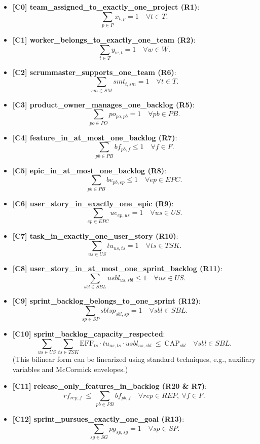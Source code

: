 \documentclass[11pt]{article}
\begin{document}
\begin{itemize}[leftmargin=*,itemsep=8pt]
  \item \textbf{[C0] team\_assigned\_to\_exactly\_one\_project (R1)}:
  \[
  \sum_{p\in P} x_{t,p}=1 \quad \forall t\in T.
  \]

  \item \textbf{[C1] worker\_belongs\_to\_exactly\_one\_team (R2)}:
  \[
  \sum_{t\in T} y_{w,t}=1 \quad \forall w\in W.
  \]

  \item \textbf{[C2] scrummaster\_supports\_one\_team (R6)}:
  \[
  \sum_{sm\in SM} smt_{t,sm}=1 \quad \forall t\in T.
  \]

  \item \textbf{[C3] product\_owner\_manages\_one\_backlog (R5)}:
  \[
  \sum_{po\in PO} po_{po,pb}=1 \quad \forall pb\in PB.
  \]

  \item \textbf{[C4] feature\_in\_at\_most\_one\_backlog (R7)}:
  \[
  \sum_{pb\in PB} bf_{pb,f}\le 1 \quad \forall f\in F.
  \]

  \item \textbf{[C5] epic\_in\_at\_most\_one\_backlog (R8)}:
  \[
  \sum_{pb\in PB} be_{pb,ep}\le 1 \quad \forall ep\in EPC.
  \]

  \item \textbf{[C6] user\_story\_in\_exactly\_one\_epic (R9)}:
  \[
  \sum_{ep\in EPC} ue_{ep,us}=1 \quad \forall us\in US.
  \]

  \item \textbf{[C7] task\_in\_exactly\_one\_user\_story (R10)}:
  \[
  \sum_{us\in US} tu_{us,ts}=1 \quad \forall ts\in TSK.
  \]

  \item \textbf{[C8] user\_story\_in\_at\_most\_one\_sprint\_backlog (R11)}:
  \[
  \sum_{sbl\in SBL} usbl_{us,sbl}\le 1 \quad \forall us\in US.
  \]

  \item \textbf{[C9] sprint\_backlog\_belongs\_to\_one\_sprint (R12)}:
  \[
  \sum_{sp\in SP} sblsp_{sbl,sp}=1 \quad \forall sbl\in SBL.
  \]

  \item \textbf{[C10] sprint\_backlog\_capacity\_respected}:
  \[
  \sum_{us\in US}\sum_{ts\in TSK} \text{EFF}_{ts}\cdot tu_{us,ts}\cdot usbl_{us,sbl} \ \le\ \text{CAP}_{sbl}\quad \forall sbl\in SBL.
  \]
  (This bilinear form can be linearized using standard techniques, e.g., auxiliary variables and McCormick envelopes.)

  \item \textbf{[C11] release\_only\_features\_in\_backlog (R20 \& R7)}:
  \[
  rf_{rep,f}\ \le\ \sum_{pb\in PB} bf_{pb,f}\quad \forall rep\in REP,\ \forall f\in F.
  \]

  \item \textbf{[C12] sprint\_pursues\_exactly\_one\_goal (R13)}:
  \[
  \sum_{sg\in SG} pg_{sp,sg}=1 \quad \forall sp\in SP.
  \]
\end{itemize}
\end{document}

